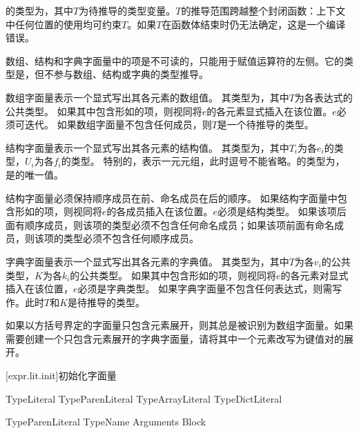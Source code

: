 \pnum
{}的类型为，其中$T$为待推导的类型变量。$T$的推导范围跨越整个封闭函数：上下文中任何位置的使用均可约束$T$。如果$T$在函数体结束时仍无法确定，这是一个编译错误。

\pnum
数组、结构和字典字面量中的项是不可读的，只能用于赋值运算符的左侧。它的类型是，但不参与数组、结构或字典的类型推导。

\pnum
数组字面量\tcode{[$e_1$, $\ldots$, $e_n$]}表示一个显式写出其各元素的数组值。
其类型为，其中$T$为各表达式的公共类型。
如果其中包含形如的项，则视同将$e$的各元素显式插入在该位置。$e$必须可迭代。
如果数组字面量不包含任何成员，则$T$是一个待推导的类型。

\pnum
结构字面量表示一个显式写出其各元素的结构值。
其类型为，其中$T_i$为各$e_i$的类型，$U_i$为各$f_i$的类型。
特别的，表示一元元组，此时逗号不能省略。\tcode{()}的类型为，是的唯一值。

\pnum
结构字面量必须保持顺序成员在前、命名成员在后的顺序。
如果结构字面量中包含形如的项，则视同将$e$的各成员插入在该位置。$e$必须是结构类型。
如果该项后面有顺序成员，则该项的类型必须不包含任何命名成员；如果该项前面有命名成员，则该项的类型必须不包含任何顺序成员。

\pnum
字典字面量\tcode{[$k_1$:$v_1$, $k_2$:$v_2$, $\ldots$, $k_n$:$v_n$]}表示一个显式写出其各元素的字典值。
其类型为，其中$T$为各$v_i$的公共类型，$K$为各$k_i$的公共类型。
如果其中包含形如的项，则视同将$e$的各元素对显式插入在该位置，$e$必须是字典类型。
如果字典字面量不包含任何表达式，则需写作\tcode{[:]}。此时$T$和$K$是待推导的类型。

\pnum
如果以方括号界定的字面量只包含元素展开，则其总是被识别为数组字面量。\enternote 如果需要创建一个只包含元素展开的字典字面量，请将其中一个元素改写为键值对的展开。\exitnote

[expr.lit.init]{初始化字面量}

\begin{bnf}{TypeLiteral}
    TypeParenLiteral \br
    TypeArrayLiteral \br
    TypeDictLiteral
\end{bnf}

\begin{bnf}{TypeParenLiteral}
    TypeName \terminal{(} Arguments\bnfq \terminal{)} Block\bnfq
\end{bnf}

